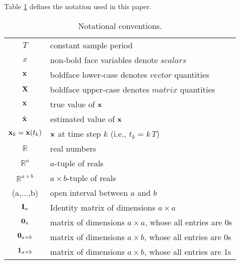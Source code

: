 Table \ref{table:notation} defines the notation used in this paper.


\begin{table}[bh]
	\centering
	\caption{Notational conventions.}
	\begin{tabular}[h]{|c|l|}
		\hline
		$T$				& constant sample period 			\T \\
		$x$ 			& non-bold face variables denote $scalars$ 			\T \\
		$\mathbf{x}$ 		& boldface lower-case denotes $vector$ quantities	\T \\ 	
		$\mathbf{X}$ 		& boldface upper-case denotes $matrix$ quantities	\T \\
		$\mathbf{x}$ 		& true value of $\mathbf{x}$ 							\T \\  	
		$\hat{\mathbf{x}}$ 	& estimated value of $\mathbf{x}$						\T \\	
		${\mathbf{x}}_{k}=\mathbf{x}(t_k)$ &  $\mathbf{x}$ at time step $k$ (i.e., $t_k=k\,T$)	\T \\	
		$\mathbb{R}$ 	& real numbers										\T \\ 	
		$\mathbb{R}^a$ 	& $a$-tuple of reals								\T \\
		$\mathbb{R}^{a \times b}$ 	& $a \times b$-tuple of reals								\T \\
		\red (a,$\dots$,b) \black	& open interval	between $a$ and $b$					\T \\
		$\mathbf{I}_{a}$ 	& Identity matrix of dimensions $a \times a $ \T \\
		$\boldsymbol{0}_{a}$ 		& matrix of dimensions $a \times a $, whose all entries are 0s 	\T \\
		$\boldsymbol{0}_{a \times b}$ 	& matrix of dimensions $a \times b $, whose all entries are 0s 	\T \\
		$\boldsymbol{1}_{a \times b}$ 	& matrix of dimensions $a \times b $, whose all entries are 1s 	\T \\
		\hline
		
	\end{tabular}
	\label{table:notation}
\end{table}

\black